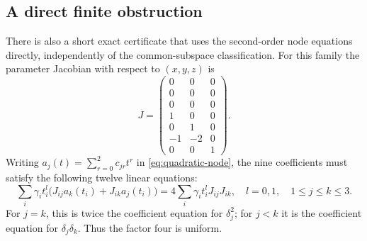 \subsection{A direct finite obstruction}
There is also a short exact certificate that uses the second-order
node equations directly, independently of the common-subspace
classification. For this family the parameter Jacobian with respect
to $(x,y,z)$ is
\[
 J=\begin{pmatrix}
 0&0&0\\0&0&0\\0&0&0\\1&0&0\\0&1&0\\-1&-2&0\\0&0&1
 \end{pmatrix}.
\]
Writing $a_j(t)=\sum_{r=0}^2c_{jr}t^r$ in
\eqref{eq:quadratic-node}, the nine coefficients must satisfy
the following twelve linear equations:
\begin{equation}\label{eq:appendix-system}
 \sum_i\gamma_i t_i^l
   \bigl(J_{ij}a_k(t_i)+J_{ik}a_j(t_i)\bigr)
 =4\sum_i\gamma_i t_i^lJ_{ij}J_{ik},
 \quad l=0,1,\quad 1\le j\le k\le3.
\end{equation}
For $j=k$, this is twice the coefficient equation for
$\delta_j^2$; for $j<k$ it is the coefficient equation for
$\delta_j\delta_k$. Thus the factor four is uniform.

